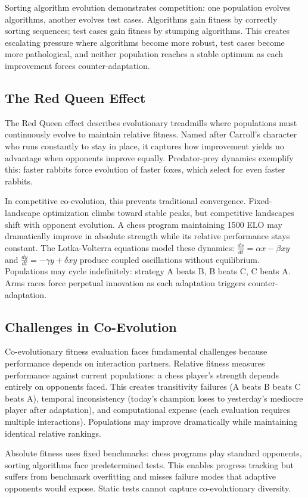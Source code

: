 \documentclass[journal,12pt,onecolumn]{IEEEtran}
\begin{document}
Sorting algorithm evolution demonstrates competition: one population evolves algorithms, another evolves test cases. Algorithms gain fitness by correctly sorting sequences; test cases gain fitness by stumping algorithms. This creates escalating pressure where algorithms become more robust, test cases become more pathological, and neither population reaches a stable optimum as each improvement forces counter-adaptation.

\subsection{The Red Queen Effect}

The Red Queen effect describes evolutionary treadmills where populations must continuously evolve to maintain relative fitness. Named after Carroll's character who runs constantly to stay in place, it captures how improvement yields no advantage when opponents improve equally. Predator-prey dynamics exemplify this: faster rabbits force evolution of faster foxes, which select for even faster rabbits.

In competitive co-evolution, this prevents traditional convergence. Fixed-landscape optimization climbs toward stable peaks, but competitive landscapes shift with opponent evolution. A chess program maintaining 1500 ELO may dramatically improve in absolute strength while its relative performance stays constant. The Lotka-Volterra equations model these dynamics: $\frac{dx}{dt} = \alpha x - \beta xy$ and $\frac{dy}{dt} = -\gamma y + \delta xy$ produce coupled oscillations without equilibrium. Populations may cycle indefinitely: strategy A beats B, B beats C, C beats A. Arms races force perpetual innovation as each adaptation triggers counter-adaptation.

\subsection{Challenges in Co-Evolution}

Co-evolutionary fitness evaluation faces fundamental challenges because performance depends on interaction partners. Relative fitness measures performance against current populations: a chess player's strength depends entirely on opponents faced. This creates transitivity failures (A beats B beats C beats A), temporal inconsistency (today's champion loses to yesterday's mediocre player after adaptation), and computational expense (each evaluation requires multiple interactions). Populations may improve dramatically while maintaining identical relative rankings.

Absolute fitness uses fixed benchmarks: chess programs play standard opponents, sorting algorithms face predetermined tests. This enables progress tracking but suffers from benchmark overfitting and misses failure modes that adaptive opponents would expose. Static tests cannot capture co-evolutionary diversity.
\end{document}
